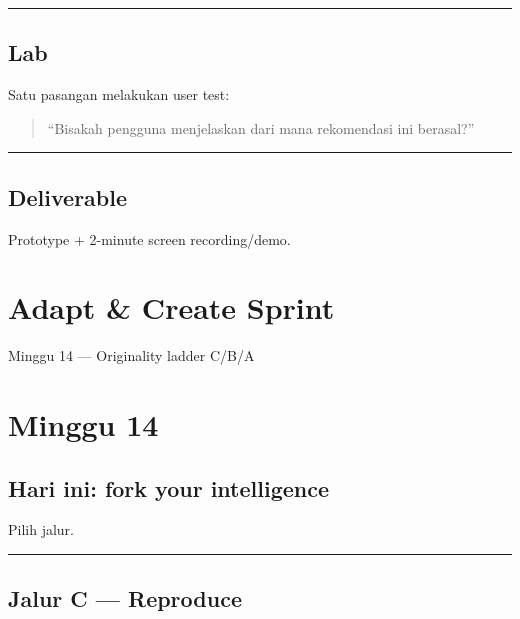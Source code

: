 \documentclass[
  indonesian,
  letterpaper,
  DIV=11,
  numbers=noendperiod]{scrreprt}
\begin{document}
\begin{center}\rule{0.5\linewidth}{0.5pt}\end{center}

\section{Lab}\label{lab-9}

Satu pasangan melakukan user test:

\begin{quote}
``Bisakah pengguna menjelaskan dari mana rekomendasi ini berasal?''
\end{quote}

\begin{center}\rule{0.5\linewidth}{0.5pt}\end{center}

\section{Deliverable}\label{deliverable-6}

Prototype + 2-minute screen recording/demo.

\chapter{Adapt \& Create Sprint}\label{adapt-create-sprint}

Minggu 14 --- Originality ladder C/B/A

\hfill\break

\chapter{Minggu 14}\label{minggu-14}

\section{Hari ini: fork your
intelligence}\label{hari-ini-fork-your-intelligence}

Pilih jalur.

\begin{center}\rule{0.5\linewidth}{0.5pt}\end{center}

\section{Jalur C --- Reproduce}\label{jalur-c-reproduce-1}
\end{document}
